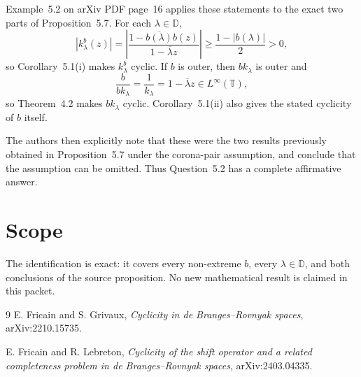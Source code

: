 \documentclass[11pt]{article}
\begin{document}
Example~5.2 on arXiv PDF page~16 applies these statements to the exact two
parts of Proposition~5.7.  For each $\lambda\in\mathbb D$,
\[
 |k^b_\lambda(z)|
 =\left|\frac{1-\overline{b(\lambda)}b(z)}{1-\overline\lambda z}\right|
 \geq \frac{1-|b(\lambda)|}{2}>0,
\]
so Corollary~5.1(i) makes $k^b_\lambda$ cyclic.  If $b$ is outer, then
$bk_\lambda$ is outer and
\[
 \frac{b}{bk_\lambda}=\frac1{k_\lambda}=1-\overline\lambda z
 \in L^\infty(\mathbb T),
\]
so Theorem~4.2 makes $bk_\lambda$ cyclic.  Corollary~5.1(ii) also gives
the stated cyclicity of $b$ itself.

The authors then explicitly note that these were the two results previously
obtained in Proposition~5.7 under the corona-pair assumption, and conclude
that the assumption can be omitted.  Thus Question~5.2 has a complete
affirmative answer.

\section{Scope}

The identification is exact: it covers every non-extreme $b$, every
$\lambda\in\mathbb D$, and both conclusions of the source proposition.
No new mathematical result is claimed in this packet.

\begin{thebibliography}{9}
E. Fricain and S. Grivaux,
\emph{Cyclicity in de Branges--Rovnyak spaces},
arXiv:2210.15735.

E. Fricain and R. Lebreton,
\emph{Cyclicity of the shift operator and a related completeness problem
in de Branges--Rovnyak spaces},
arXiv:2403.04335.
\end{thebibliography}
\end{document}

